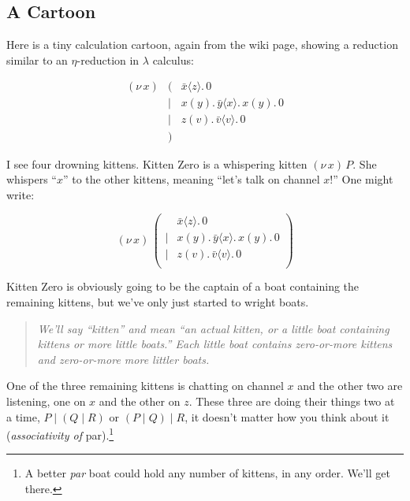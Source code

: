 \documentclass[10pt,oneside,x11names]{article}
\newcommand\napping    [0]{0}
\newcommand\chatting   [3]{\bar{#1}\langle{#2}\rangle{}.\,#3}
\newcommand\listening  [3]{#1(#2).\,#3}
\newcommand\two        [2]{#1\mathrel{\vert}{#2}}
\newcommand\whispering [2]{(\nu\,#1)\,{#2}}
\newcommand{\kitOne}{\chatting{x}{z}{\napping}}
\newcommand{\kitTwo}{\listening{x}{y}{\chatting{y}{x}{\listening{x}{y}{\napping}}}}
\newcommand{\kitThree}{\listening{z}{v}{\chatting{v}{v}{\napping}}}
\newcommand{\wkit}{\whispering{x}{P}}
\theoremstyle{definition}
\theoremstyle{warning}
\begin{document}
\subsection{A Cartoon}
\label{sec:org79e3d9f}

Here is a tiny calculation cartoon, again from the wiki page,
showing a reduction similar to an \(\eta\)\nobreakdash-reduction in
\(\lambda\) calculus:

\begin{equation}
\begin{array}{clll}
  (\nu\,x) & (      & \kitOne \\
           & \vert  & \kitTwo \\
           & \vert  & \kitThree \\
       {}  & )
\end{array}
\end{equation}

I see four drowning kittens. Kitten Zero is a whispering
kitten \(\wkit\). She whispers ``\(x\)'' to the other kittens,
meaning ``let's talk on channel \(x\)!'' One might write:

\begin{equation}
\label{eqn:the-first-boat}
\whispering{x}{\left(
\begin{array}{clll}
 {}     & \kitOne \\
 \vert  & \kitTwo \\
 \vert  & \kitThree \\
\end{array}\right)}
\end{equation}

Kitten Zero is obviously going to be the captain of a boat
containing the remaining kittens, but we've only just started to
wright boats.

\begin{quote}
\emph{We'll say ``kitten'' and mean ``an actual kitten, or a little boat
containing kittens or more little boats.'' Each little boat contains zero-or-more kittens and zero-or-more more littler boats.}
\end{quote}

One of the three remaining kittens is chatting on channel \(x\) and
the other two are listening, one on \(x\) and the other on \(z\).
These three are doing their things two at a time,
\(\two{P}{(\two{Q}{R})}\) or \(\two{(\two{P}{Q})}{R}\), it doesn't
matter how you think about it (\emph{associativity of} par).\footnote{A
better \emph{par} boat could hold any number of kittens, in any order.
We'll get there.}
\end{document}
